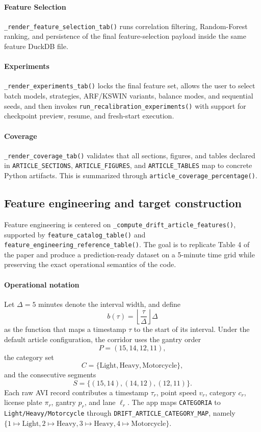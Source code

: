 \paragraph{Feature Selection}
\texttt{\_render\_feature\_selection\_tab()} runs correlation filtering, Random-Forest ranking, and persistence of the final feature-selection payload inside the same feature DuckDB file.

\paragraph{Experiments}
\texttt{\_render\_experiments\_tab()} locks the final feature set, allows the user to select batch models, strategies, ARF/KSWIN variants, balance modes, and sequential seeds, and then invokes \texttt{run\_recalibration\_experiments()} with support for checkpoint preview, resume, and fresh-start execution.

\paragraph{Coverage}
\texttt{\_render\_coverage\_tab()} validates that all sections, figures, and tables declared in \texttt{ARTICLE\_SECTIONS}, \texttt{ARTICLE\_FIGURES}, and \texttt{ARTICLE\_TABLES} map to concrete Python artifacts. This is summarized through \texttt{article\_coverage\_percentage()}.

\subsection{Feature engineering and target construction}
Feature engineering is centered on \texttt{\_compute\_drift\_article\_features()}, supported by \texttt{feature\_catalog\_table()} and \texttt{feature\_engineering\_reference\_table()}. The goal is to replicate Table 4 of the paper and produce a prediction-ready dataset on a 5-minute time grid while preserving the exact operational semantics of the code.

\paragraph{Operational notation}
Let \(\Delta = 5\) minutes denote the interval width, and define
\[
b(\tau) = \left\lfloor \frac{\tau}{\Delta} \right\rfloor \Delta
\]
as the function that maps a timestamp \(\tau\) to the start of its interval. Under the default article configuration, the corridor uses the gantry order
\[
P = (15, 14, 12, 11),
\]
the category set
\[
C = \{\mathrm{Light}, \mathrm{Heavy}, \mathrm{Motorcycle}\},
\]
and the consecutive segments
\[
S = \{(15,14), (14,12), (12,11)\}.
\]
Each raw AVI record contributes a timestamp \(\tau_r\), point speed \(v_r\), category \(c_r\), license plate \(\pi_r\), gantry \(p_r\), and lane \(\ell_r\). The app maps \texttt{CATEGORIA} to \texttt{Light/Heavy/Motorcycle} through \texttt{DRIFT\_ARTICLE\_CATEGORY\_MAP}, namely \(\{1\mapsto \mathrm{Light}, 2\mapsto \mathrm{Heavy}, 3\mapsto \mathrm{Heavy}, 4\mapsto \mathrm{Motorcycle}\}\).

